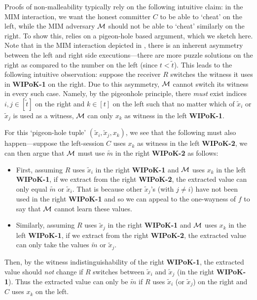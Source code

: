  Proofs of non-malleability typically rely on the following intuitive claim: in the MIM interaction, we want the honest committer $C$ to be able to `cheat' on the left, while the MIM adversary $\mathcal{M}$ should not be able to `cheat' similarly on the right. To show this, \cite{FOCS:LPY23} relies on a pigeon-hole based argument, which we sketch here. Note that in the MIM interaction depicted in , there is an inherent asymmetry between the left and right side executions---there are more puzzle solutions on the right as compared to the number on the left (since $t < \tilde{t}$). This leads to the following intuitive observation: suppose the receiver $R$ switches the witness it uses in {\bf WIPoK-1} on the right. Due to this asymmetry, $\mathcal{M}$ cannot switch its witness in every such case. Namely, by the pigeonhole principle, there {\em must} exist indices $i,j \in [\tilde{t}]$ on the right and $k \in [t]$ on the left such that no matter which of $\tilde{x}_i$ or $\tilde{x}_j$ is used as a witness, $\mathcal{M}$ can only $x_k$ as witness in the left {\bf WIPoK-1}. 

For this `pigeon-hole tuple' $(\tilde{x}_i, \tilde{x}_j, x_k)$, we see that the following must also happen---suppose the left-session $C$ uses $x_k$ as witness in the left {\bf WIPoK-2}, we can then argue that $\mathcal{M}$ must use $\tilde{m}$ in the right {\bf WIPoK-2} as follows: 
\begin{itemize}
\item
First, assuming $R$ uses $\tilde{x}_i$ in the right {\bf WIPoK-1} and $\mathcal{M}$ uses $x_k$ in the left {\bf WIPoK-1}, if we extract from the right {\bf WIPoK-2}, the extracted value can only equal $\tilde{m}$ or $\tilde{x}_i$. That is because other $\tilde{x}_j$'s (with $j \ne i$) have not been used in the right {\bf WIPoK-1} and so we can appeal to the one-wayness of $f$ to say that $\mathcal{M}$ cannot learn these values.
\item
Similarly, assuming $R$ uses $\tilde{x}_j$ in the right {\bf WIPoK-1}  and $\mathcal{M}$ uses $x_k$ in the left {\bf WIPoK-1}, if we extract from the right {\bf WIPoK-2}, the extracted value can only take the values $\tilde{m}$ or $\tilde{x}_j$.  
\end{itemize}
Then, by the witness indistinguishability of the right {\bf WIPoK-1}, the extracted value should {\em not} change if $R$ switches between $\tilde{x}_i$ and $\tilde{x}_j$ (in the right {\bf WIPoK-1}). Thus the extracted value can only be $\tilde{m}$ if $R$ uses $\tilde{x}_i$ (or $\tilde{x}_j$) on the right and $C$ uses $x_k$ on the left.


